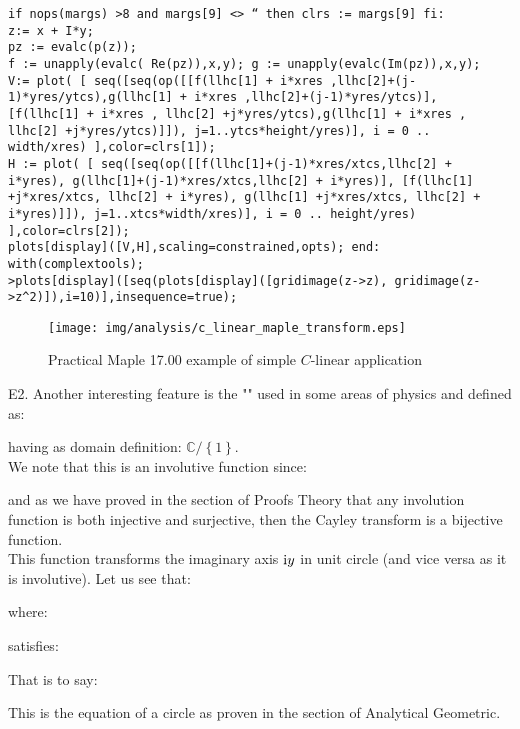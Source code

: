 	\begin{tcolorbox}[colframe=black,colback=white,sharp corners]
\texttt{if nops(margs) >8 and margs[9] <> `` then clrs := margs[9] fi:\\
z:= x + I*y;\\
pz := evalc(p(z));\\
f := unapply(evalc( Re(pz)),x,y); g := unapply(evalc(Im(pz)),x,y);\\
V:= plot( [
seq([seq(op([[f(llhc[1] + i*xres ,llhc[2]+(j-1)*yres/ytcs),g(llhc[1] + i*xres ,llhc[2]+(j-1)*yres/ytcs)], [f(llhc[1] + i*xres , llhc[2] +j*yres/ytcs),g(llhc[1] + i*xres , llhc[2] +j*yres/ytcs)]]),
j=1..ytcs*height/yres)], i = 0 .. width/xres)
],color=clrs[1]);\\
H := plot( [
seq([seq(op([[f(llhc[1]+(j-1)*xres/xtcs,llhc[2] + i*yres),
g(llhc[1]+(j-1)*xres/xtcs,llhc[2] + i*yres)], 
[f(llhc[1] +j*xres/xtcs, llhc[2] + i*yres),
g(llhc[1] +j*xres/xtcs, llhc[2] + i*yres)]]),
j=1..xtcs*width/xres)], i = 0 .. height/yres)
],color=clrs[2]);\\
plots[display]([V,H],scaling=constrained,opts);
end:\\
with(complextools);}\\

\texttt{>plots[display]([seq(plots[display]([gridimage(z->z), gridimage(z->z\string^2)]),i=10)],insequence=true);}
	\begin{figure}[H]
		\begin{center}
			\texttt{[image: img/analysis/c\_linear\_maple\_transform.eps]}
		\end{center}	
		\caption{Practical Maple 17.00 example of simple $C$-linear application}
	\end{figure}
	\end{tcolorbox}
	
	\begin{tcolorbox}[colframe=black,colback=white,sharp corners]
E2. Another interesting feature is the "" used in some areas of physics and defined as:
	
having as domain definition: $\mathbb{C}/\left\lbrace 1\right\rbrace$.\\

We note that this is an involutive function since:
	
and as we have proved in the section of Proofs Theory that any involution function is both injective and surjective, then the Cayley transform is a bijective function.\\

This function transforms the imaginary axis $\mathrm{i} y$ in unit circle (and vice versa as it is involutive). Let us see that:
	
where:
	
satisfies:
	
That is to say:
	
This is the equation of a circle as proven in the section of Analytical Geometric.
	\end{tcolorbox}

